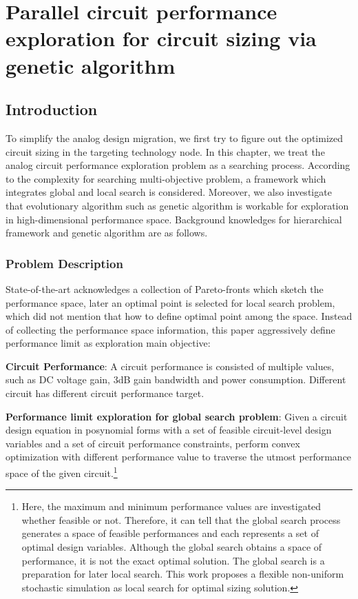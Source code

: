 
\chapter{Parallel circuit performance exploration for circuit sizing via genetic algorithm}\label{chap:PAGE}
  \section{Introduction}\label{sec:PAGEIntro}
    To simplify the analog design migration, we first try to figure out the optimized circuit sizing in the targeting technology node. In this chapter, we treat the analog circuit performance exploration problem as a searching process. According to the complexity for searching multi-objective problem, a framework which integrates global and local search is considered. Moreover, we also investigate that evolutionary algorithm such as genetic algorithm is workable for exploration in high-dimensional performance space. Background knowledges for hierarchical framework and genetic algorithm are as follows.
    

    \subsection{Problem Description} 
      State-of-the-art acknowledges a collection of Pareto-fronts which sketch the performance space, later an optimal point is selected for local search problem, which did not mention that how to define optimal point among the space. Instead of collecting the performance space information, this paper aggressively define performance limit as exploration main objective:

      
      
      \begin{defi}
        {\bf Circuit Performance}: A circuit performance is consisted of multiple values, such as DC voltage gain, 3dB gain bandwidth and power consumption. Different circuit has different circuit performance target.
      \end{defi}

      \begin{defi}
        {\bf Performance limit exploration for global search problem}: Given a circuit design equation in posynomial forms with a set of feasible circuit-level design variables and a set of circuit performance constraints, perform convex optimization with different performance value to traverse the utmost performance space of the given circuit.\footnote{Here, the maximum and minimum performance values are investigated whether feasible or not. Therefore, it can tell that the global search process generates a space of feasible performances and each represents a set of optimal design variables. Although the global search obtains a space of performance, it is not the exact optimal solution. The global search is a preparation for later local search. This work proposes a flexible non-uniform stochastic simulation as local search for optimal sizing solution. }
      \end{defi}


